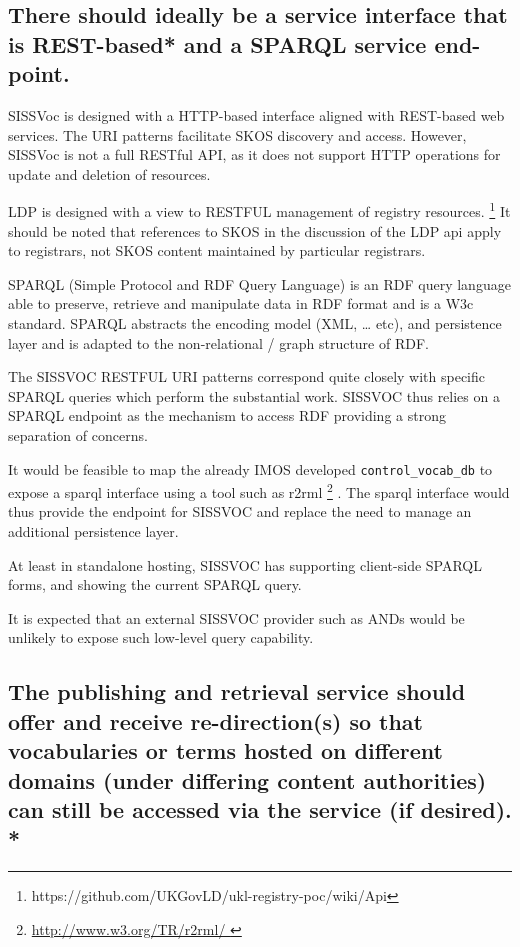 \documentclass[10pt,a4paper]{article}
\begin{document}
\begin{flushleft}
\subsection{ 
  There should ideally be a service interface that is REST-based* and a SPARQL service end-point.
}

    SISSVoc is designed with a HTTP-based interface aligned with REST-based web
services. The URI patterns facilitate SKOS discovery and access. However,
SISSVoc is not a full RESTful API, as it does not support HTTP operations for
update and deletion of resources.
    
    LDP is designed with a view to RESTFUL management of registry resources.
\footnote { https://github.com/UKGovLD/ukl-registry-poc/wiki/Api } It should be
noted that references to SKOS in the discussion of the LDP api apply to
registrars, not SKOS content maintained by particular registrars.  


    SPARQL (Simple Protocol and RDF Query Language) is an RDF query language
able to preserve, retrieve and manipulate data in RDF format and is a W3c
standard.  SPARQL abstracts the encoding model (XML, … etc), and persistence
layer and is adapted to the non-relational / graph structure of RDF.

    The SISSVOC RESTFUL URI patterns correspond quite closely with specific SPARQL queries
which perform the substantial work. SISSVOC thus relies on a SPARQL endpoint as the
mechanism to access RDF providing a strong separation of concerns.

    It would be feasible to map the already IMOS developed
\texttt{control\_vocab\_db} to expose a sparql interface using a tool such as
r2rml \footnote{ \url{ http://www.w3.org/TR/r2rml/ } } .  The sparql interface
would thus provide the endpoint for SISSVOC and replace the need to manage an
additional persistence layer.

	At least in standalone hosting, SISSVOC has supporting client-side SPARQL forms, 
	and showing the current SPARQL query.

    It is expected that an external SISSVOC provider such as ANDs would be
unlikely to expose such low-level query capability.
   

\subsection{ The publishing and retrieval service should offer and receive
re-direction(s) so that vocabularies or terms hosted on different domains (under
differing content authorities) can still be accessed via the service (if
desired). * }


\end{flushleft}
\end{document}
